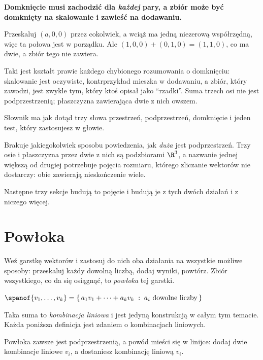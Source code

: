 \begin{fr}
\begin{trapbox}
\textbf{Domknięcie musi zachodzić dla \emph{każdej} pary, a zbiór może być
domknięty na skalowanie i zawieść na dodawaniu.}

Przeskaluj $(a, 0, 0)$ przez cokolwiek, a wciąż ma jedną niezerową
współrzędną, więc ta połowa jest w porządku. Ale
$(1, 0, 0) + (0, 1, 0) = (1, 1, 0)$, co ma dwie, a zbiór tego nie zawiera.

Taki jest kształt prawie każdego chybionego rozumowania o domknięciu:
skalowanie jest oczywiste, kontrprzykład mieszka w dodawaniu, a zbiór, który
zawodzi, jest zwykle tym, który ktoś opisał jako \enquote{rzadki}. Suma trzech
osi nie jest podprzestrzenią; płaszczyzna zawierająca dwie z nich owszem.
\end{trapbox}
\end{fr}

\begin{fr}
Słownik ma jak dotąd trzy słowa \dash{} przestrzeń, podprzestrzeń, domknięcie
\dash{} i jeden test, który zastosujesz w głowie.

Brakuje jakiegokolwiek sposobu powiedzenia, jak \emph{duża} jest
podprzestrzeń. Trzy osie i płaszczyzna przez dwie z nich są podzbiorami
$\R^{3}$, a nazwanie jednej większą od drugiej potrzebuje pojęcia rozmiaru,
którego zliczanie wektorów nie dostarczy: obie zawierają nieskończenie wiele.

Następne trzy sekcje budują to pojęcie i budują je z tych dwóch działań i z
niczego więcej.
\end{fr}

\section{Powłoka}
\label{sec:P04-span}

\begin{fr}
Weź garstkę wektorów i zastosuj do nich oba działania na wszystkie możliwe
sposoby: przeskaluj każdy dowolną liczbą, dodaj wyniki, powtórz. Zbiór
wszystkiego, co da się osiągnąć, to \emph{powłoka} tej garstki.

\medskip
\noindent
$\spanof\{v_1, \dots, v_k\}
  = \{\, a_1 v_1 + \dots + a_k v_k \;:\; a_i \text{ dowolne liczby} \,\}$

\medskip
\noindent
Taka suma to \emph{kombinacja liniowa} i jest jedyną konstrukcją w całym tym
temacie. Każda poniższa definicja jest zdaniem o kombinacjach liniowych.

Powłoka zawsze jest podprzestrzenią, a powód mieści się w linijce: dodaj dwie
kombinacje liniowe $v_i$, a dostaniesz kombinację liniową $v_i$.
\end{fr}

